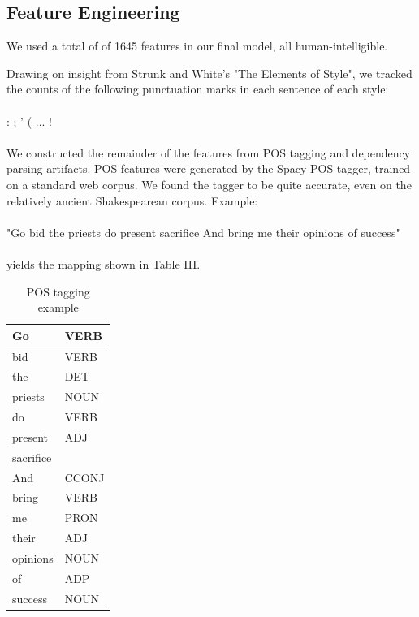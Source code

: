 \documentclass[letterpaper, 10 pt, conference]{ieeeconf}  %
\begin{document}
\subsection{Feature Engineering}
We used a total of of 1645 features in our final model, all human-intelligible.

Drawing on insight from Strunk and White's "The Elements of Style", we tracked the counts of the following punctuation marks in each sentence of each style: 
\\
\\
 : ; ' ( ... !
\\
\\
We constructed the remainder of the features from POS tagging and dependency parsing artifacts.
POS features were generated by the Spacy POS tagger, trained on a standard web corpus. We found the tagger to be quite accurate, even on the relatively ancient Shakespearean corpus. Example:\\
\\
"Go bid the priests do present sacrifice And bring me their opinions of success"\\
\\
yields the mapping shown in Table III.
\\
\begin{table}[h]
  \caption{POS tagging example}
  \label{table_example}
  \begin{center}
    \begin{tabular}{| p{2cm}  | p{2cm} | }
      \hline
      Go&VERB  \\  
      \hline
      bid&VERB\\ 
      \hline
      the&DET   \\
      \hline
      priests&NOUN \\
      \hline
      do&VERB   \\
      \hline
      present&ADJ  \\
      \hline
      sacrifice&\\
      \hline
      And&CCONJ \\
      \hline
      bring&VERB  \\
      \hline
      me&PRON   \\
      \hline
      their&ADJ    \\
      \hline
      opinions&NOUN  \\
      \hline
      of&ADP    \\
      \hline
      success&NOUN \\
      \hline
    \end{tabular}
  \end{center}
\end{table}
\end{document}
